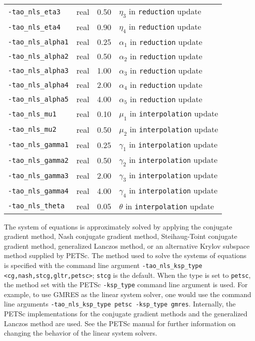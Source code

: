 \begin{table}[h]
\begin{tabular}{l|p{1.5in}|l|p{2.0in}}
{\tt -tao\_nls\_eta3} & real & 0.50 & $\eta_3$ in {\tt reduction} update \\
{\tt -tao\_nls\_eta4} & real & 0.90 & $\eta_4$ in {\tt reduction} update \\
{\tt -tao\_nls\_alpha1} & real & 0.25 & $\alpha_1$ in {\tt reduction} update \\
{\tt -tao\_nls\_alpha2} & real & 0.50 & $\alpha_2$ in {\tt reduction} update \\
{\tt -tao\_nls\_alpha3} & real & 1.00 & $\alpha_3$ in {\tt reduction} update \\
{\tt -tao\_nls\_alpha4} & real & 2.00 & $\alpha_4$ in {\tt reduction} update \\
{\tt -tao\_nls\_alpha5} & real & 4.00 & $\alpha_5$ in {\tt reduction} update \\
{\tt -tao\_nls\_mu1} & real & 0.10 & $\mu_1$ in {\tt interpolation} update \\
{\tt -tao\_nls\_mu2} & real & 0.50 & $\mu_2$ in {\tt interpolation} update \\
{\tt -tao\_nls\_gamma1} & real & 0.25 & $\gamma_1$ in {\tt interpolation} update \\
{\tt -tao\_nls\_gamma2} & real & 0.50 & $\gamma_2$ in {\tt interpolation} update \\
{\tt -tao\_nls\_gamma3} & real & 2.00 & $\gamma_3$ in {\tt interpolation} update \\
{\tt -tao\_nls\_gamma4} & real & 4.00 & $\gamma_4$ in {\tt interpolation} update \\
{\tt -tao\_nls\_theta} & real & 0.05 & $\theta$ in {\tt interpolation} update \\
\hline
\end{tabular}
\end{table}
\afterpage{\clearpage}

The system of equations is approximately solved by applying the conjugate 
gradient method, Nash conjugate gradient method, Steihaug-Toint conjugate 
gradient method, generalized 
Lanczos method, or an alternative Krylov subspace method 
supplied by PETSc.  The method used to solve the systems of equations is 
specified with the command line argument 
{\tt -tao\_nls\_ksp\_type <cg,nash,stcg,gltr,petsc>}; {\tt stcg} 
is the default.  When the type is set to {\tt petsc}, the method set with 
the PETSc {\tt -ksp\_type} command line argument is used.  For example, to 
use GMRES as the linear system solver, one would use the command line 
arguments {\tt -tao\_nls\_ksp\_type petsc -ksp\_type gmres}.  Internally,
the PETSc implementations for the conjugate gradient methods and the 
generalized Lanczos method are used.  See the PETSc manual for further 
information on changing the behavior of the linear system solvers.  


